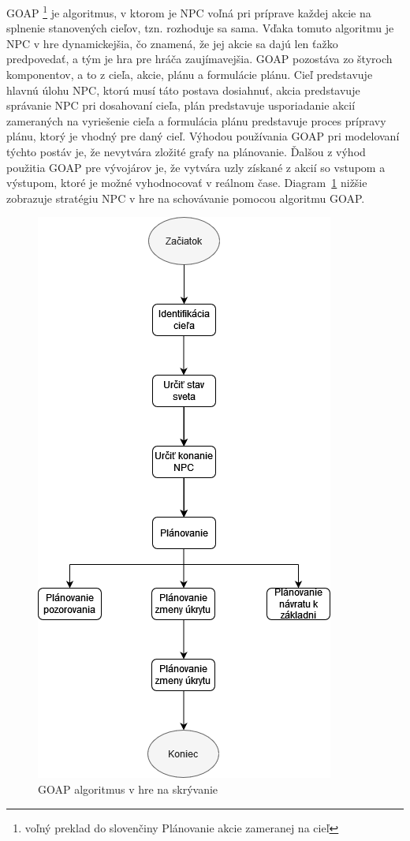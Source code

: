 \documentclass[10pt,twoside,slovak,a4paper]{article}
\begin{document}
\begin{itemize}
\quad GOAP \footnote{voľný preklad do slovenčiny Plánovanie akcie zameranej na cieľ} je algoritmus, v ktorom je NPC voľná pri príprave každej akcie na splnenie stanovených cieľov, tzn. rozhoduje sa sama. Vďaka tomuto algoritmu je NPC v hre dynamickejšia, čo znamená, že jej akcie sa dajú len ťažko predpovedať, a tým je hra pre hráča zaujímavejšia. GOAP pozostáva zo štyroch komponentov, a to z cieľa, akcie, plánu a formulácie plánu. Cieľ predstavuje hlavnú úlohu NPC, ktorú musí táto postava dosiahnuť, akcia predstavuje správanie NPC pri dosahovaní cieľa, plán predstavuje usporiadanie akcií zameraných na vyriešenie cieľa a formulácia plánu predstavuje proces prípravy plánu, ktorý je vhodný pre daný cieľ.  Výhodou používania GOAP pri modelovaní týchto postáv je, že nevytvára zložité grafy na plánovanie. Ďalšou z výhod použitia GOAP pre vývojárov je, že vytvára uzly získané z akcií so vstupom a výstupom, ktoré je možné vyhodnocovať v reálnom čase. Diagram~\ref{f:d1} nižšie zobrazuje stratégiu NPC v hre na schovávanie pomocou algoritmu GOAP.  \cite{NPC}
\begin{figure}[tbh]
\center\includegraphics[scale=0.5]{diagram1.png}
\caption{GOAP algoritmus v hre na skrývanie}
\label{f:d1}
\end{figure}
\end{itemize}
\end{document}
